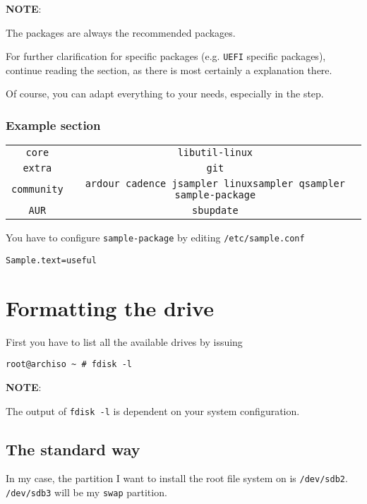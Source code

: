 \documentclass[9pt]{report}
\newcommand{\admonition}[2]{\textbf{#1}: {#2}}
\begin{document}
\admonition{NOTE}{The packages are always the recommended packages.


For further clarification for specific packages (e.g. \texttt{UEFI} specific packages), continue reading the section, as there is most certainly a explanation there.


Of course, you can adapt everything to your needs, especially in the \hyperlink{additional-setup-packages}{} step.

}

\vfill\eject

\hypertarget{x-example-section}{\subsubsection{Example section}}
\begin{center}
\begin{tabular}{|c|c|}
\hline
\texttt{core} & \texttt{libutil-linux} \\ 
\texttt{extra} & \texttt{git} \\ 
\texttt{community} & \texttt{ardour cadence jsampler linuxsampler qsampler sample-package} \\ 
\texttt{AUR} & \texttt{sbupdate} \\ 
\hline
\end{tabular}
\end{center}

You have to configure \texttt{sample-package} by editing \texttt{/etc/sample.conf}


\begin{verbatim}
Sample.text=useful
\end{verbatim}


\vfill\eject

\hypertarget{x-formatting-the-drive}{\section{Formatting the drive}}
First you have to list all the available drives by issuing


\begin{verbatim}
root@archiso ~ # fdisk -l
\end{verbatim}

\admonition{NOTE}{The output of \texttt{fdisk -l} is dependent on your system configuration.

}

\vfill\eject

\hypertarget{x-the-standard-way}{\subsection{The standard way}}
In my case, the partition I want to install the root file system on is \texttt{/dev/sdb2}.
\texttt{/dev/sdb3} will be my \texttt{swap} partition.
\end{document}
